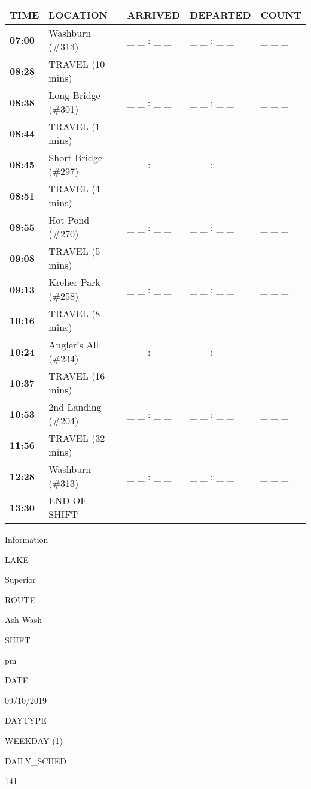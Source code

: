 \documentclass[]{article}
\begin{document}
\begin{tabular}{>{\bfseries}lllll}
\toprule
\textbf{TIME} & \textbf{LOCATION} & \textbf{ARRIVED} & \textbf{DEPARTED} & \textbf{COUNT}\\
\midrule
07:00 & Washburn (\#313) & \_ \_ : \_ \_ & \_ \_ : \_ \_ & \_ \_ \_\\
08:28 & TRAVEL (10 mins) &  &  & \\
08:38 & Long Bridge (\#301) & \_ \_ : \_ \_ & \_ \_ : \_ \_ & \_ \_ \_\\
08:44 & TRAVEL (1 mins) &  &  & \\
08:45 & Short Bridge (\#297) & \_ \_ : \_ \_ & \_ \_ : \_ \_ & \_ \_ \_\\
08:51 & TRAVEL (4 mins) &  &  & \\
08:55 & Hot Pond (\#270) & \_ \_ : \_ \_ & \_ \_ : \_ \_ & \_ \_ \_\\
09:08 & TRAVEL (5 mins) &  &  & \\
09:13 & Kreher Park (\#258) & \_ \_ : \_ \_ & \_ \_ : \_ \_ & \_ \_ \_\\
10:16 & TRAVEL (8 mins) &  &  & \\
10:24 & Angler's All (\#234) & \_ \_ : \_ \_ & \_ \_ : \_ \_ & \_ \_ \_\\
10:37 & TRAVEL (16 mins) &  &  & \\
10:53 & 2nd Landing (\#204) & \_ \_ : \_ \_ & \_ \_ : \_ \_ & \_ \_ \_\\
11:56 & TRAVEL (32 mins) &  &  & \\
12:28 & Washburn (\#313) & \_ \_ : \_ \_ & \_ \_ : \_ \_ & \_ \_ \_\\
13:30 & END OF SHIFT &  &  & \\
\bottomrule
\end{tabular}\newpage

Information

LAKE

Superior

ROUTE

Ash-Wash

SHIFT

pm

DATE

09/10/2019

DAYTYPE

WEEKDAY (1)

DAILY\_SCHED

141

\vspace{24pt}
\end{document}
